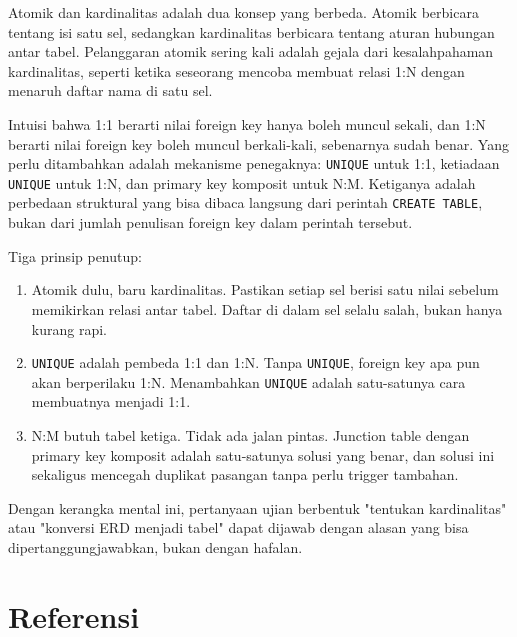 \documentclass[11pt,a4paper]{article}
\begin{document}
Atomik dan kardinalitas adalah dua konsep yang berbeda. Atomik berbicara tentang isi satu sel, sedangkan kardinalitas berbicara tentang aturan hubungan antar tabel. Pelanggaran atomik sering kali adalah gejala dari kesalahpahaman kardinalitas, seperti ketika seseorang mencoba membuat relasi 1:N dengan menaruh daftar nama di satu sel.

Intuisi bahwa 1:1 berarti nilai foreign key hanya boleh muncul sekali, dan 1:N berarti nilai foreign key boleh muncul berkali-kali, sebenarnya sudah benar. Yang perlu ditambahkan adalah mekanisme penegaknya: \texttt{UNIQUE} untuk 1:1, ketiadaan \texttt{UNIQUE} untuk 1:N, dan primary key komposit untuk N:M. Ketiganya adalah perbedaan struktural yang bisa dibaca langsung dari perintah \texttt{CREATE TABLE}, bukan dari jumlah penulisan foreign key dalam perintah tersebut.

Tiga prinsip penutup:

\begin{enumerate}
	\item Atomik dulu, baru kardinalitas. Pastikan setiap sel berisi satu nilai sebelum memikirkan relasi antar tabel. Daftar di dalam sel selalu salah, bukan hanya kurang rapi.
	\item \texttt{UNIQUE} adalah pembeda 1:1 dan 1:N. Tanpa \texttt{UNIQUE}, foreign key apa pun akan berperilaku 1:N. Menambahkan \texttt{UNIQUE} adalah satu-satunya cara membuatnya menjadi 1:1.
	\item N:M butuh tabel ketiga. Tidak ada jalan pintas. Junction table dengan primary key komposit adalah satu-satunya solusi yang benar, dan solusi ini sekaligus mencegah duplikat pasangan tanpa perlu trigger tambahan.
\end{enumerate}

Dengan kerangka mental ini, pertanyaan ujian berbentuk "tentukan kardinalitas" atau "konversi ERD menjadi tabel" dapat dijawab dengan alasan yang bisa dipertanggungjawabkan, bukan dengan hafalan.

\newpage
\section*{Referensi}
\end{document}

